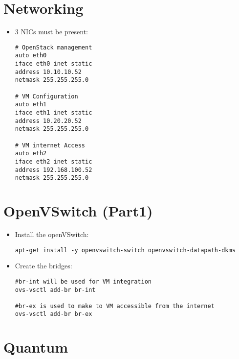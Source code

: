 \section{Networking}
\label{networking}

\begin{itemize}
\item 3 NICs must be present:

\begin{verbatim}
# OpenStack management
auto eth0
iface eth0 inet static
address 10.10.10.52
netmask 255.255.255.0

# VM Configuration
auto eth1
iface eth1 inet static
address 10.20.20.52
netmask 255.255.255.0

# VM internet Access
auto eth2
iface eth2 inet static
address 192.168.100.52
netmask 255.255.255.0
\end{verbatim}


\end{itemize}

\section{OpenVSwitch (Part1)}
\label{openvswitchpart1}

\begin{itemize}
\item Install the openVSwitch:

\begin{verbatim}
apt-get install -y openvswitch-switch openvswitch-datapath-dkms
\end{verbatim}


\item Create the bridges:

\begin{verbatim}
#br-int will be used for VM integration  
ovs-vsctl add-br br-int

#br-ex is used to make to VM accessible from the internet
ovs-vsctl add-br br-ex
\end{verbatim}


\end{itemize}

\section{Quantum}
\label{quantum}

